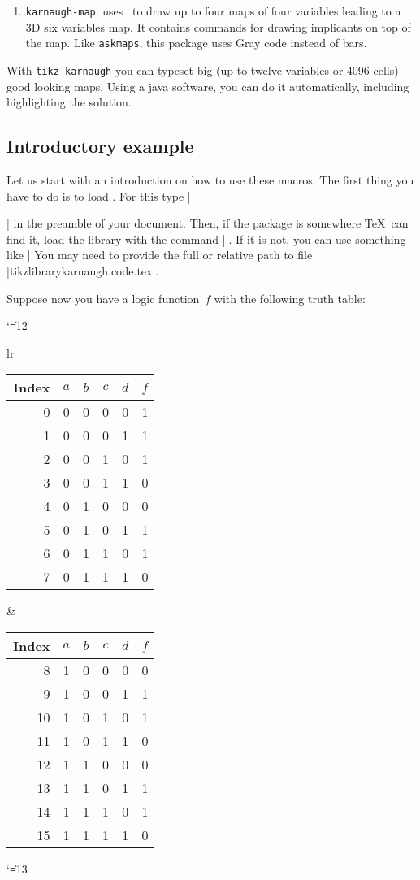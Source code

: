 \documentclass[a4paper]{ltxdoc}
\begin{document}
\begin{enumerate}
\item \verb|karnaugh-map|: uses \tikzname\ to draw up to four maps of four variables leading to a 3D six variables map. It contains commands for drawing implicants on top of the map. Like \verb|askmaps|, this package uses Gray code instead of bars.
\end{enumerate}

With \verb|tikz-karnaugh| you can typeset big (up to twelve variables or 4096 cells) good looking maps. Using a java software, you can do it automatically, including highlighting the solution.


\subsection{Introductory example}

Let us start with an introduction on how to use these macros. The first thing you have to do is to load \tikzname. For this type |\usepackage{tikz}| in the preamble of your document. Then, if the package is somewhere \TeX\ can find it, load the library with the command |\usetikzlibrary{karnaugh}|. If it is not, you can use something like | You may need to provide the full or relative path to file |tikzlibrarykarnaugh.code.tex|.

Suppose now you have a logic function~$f$ with the following truth table: 

\begin{center}
  \catcode`\|=12
\begin{tabular}{lr}
  \begin{tabular}[t]{r|cccc|c}
Index & $a$ & $b$ & $c$ & $d$ & $f$\\
\hline
0 & 0 & 0 & 0 & 0 & 1\\
1 & 0 & 0 & 0 & 1 & 1\\
2 & 0 & 0 & 1 & 0 & 1\\
3 & 0 & 0 & 1 & 1 & 0\\
4 & 0 & 1 & 0 & 0 & 0\\
5 & 0 & 1 & 0 & 1 & 1\\
6 & 0 & 1 & 1 & 0 & 1\\
7 & 0 & 1 & 1 & 1 & 0\\
  \end{tabular}
 & 
  \begin{tabular}[t]{r|cccc|c}
Index & $a$ & $b$ & $c$ & $d$ & $f$\\
\hline
8 & 1 & 0 & 0 & 0 & 0\\
9 & 1 & 0 & 0 & 1 & 1\\
10 & 1 & 0 & 1 & 0 & 1\\
11 & 1 & 0 & 1 & 1 & 0\\
12 & 1 & 1 & 0 & 0 & 0\\
13 & 1 & 1 & 0 & 1 & 1\\
14 & 1 & 1 & 1 & 0 & 1\\
15 & 1 & 1 & 1 & 1 & 0\\
  \end{tabular}
\end{tabular}
  \catcode`\|=13
\end{center}
\end{document}
